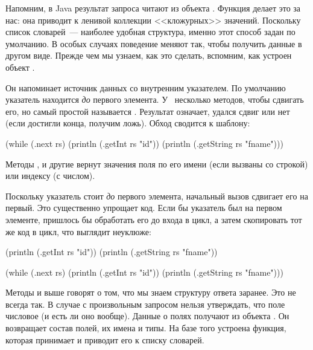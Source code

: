 
Напомним, в Java результат запроса читают из объекта . Функция  делает это за нас: она приводит  к ленивой коллекции <<кложурных>> значений. Поскольку список словарей~--- наиболее удобная структура, именно этот способ задан по умолчанию. В особых случаях поведение  меняют так, чтобы получить данные в другом виде. Прежде чем мы узнаем, как это сделать, вспомним, как устроен объект .

Он напоминает источник данных со внутренним указателем. По умолчанию указатель находится \emph{до} первого элемента. У~ несколько методов, чтобы сдвигать его, но самый простой называется . Результат означает, удался сдвиг или нет (если достигли конца, получим ложь). Обход  сводится к шаблону:

\begin{english}
  \begin{clojure}
(while (.next rs)
  (println (.getInt rs "id"))
  (println (.getString rs "fname")))
  \end{clojure}
\end{english}

Методы ,  и другие вернут значения поля по его имени (если вызваны со строкой) или индексу (с числом).

Поскольку указатель стоит \emph{до} первого элемента, начальный вызов  сдвигает его на первый. Это существенно упрощает код. Если бы указатель был на первом элементе, пришлось бы обработать его до входа в цикл, а затем скопировать тот же код в цикл, что выглядит неуклюже:

\begin{english}
  \begin{clojure}
(println (.getInt rs "id"))
(println (.getString rs "fname"))

(while (.next rs)
  (println (.getInt rs "id"))
  (println (.getString rs "fname")))
  \end{clojure}
\end{english}

Методы  и  выше говорят о том, что мы знаем структуру ответа заранее. Это не всегда так. В случае с произвольным запросом нельзя утверждать, что поле  числовое (и есть ли оно вообще). Данные о полях получают из объекта . Он возвращает состав полей, их имена и типы. На базе того устроена функция, которая принимает  и приводит его к списку словарей.

